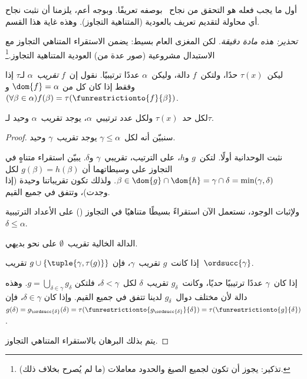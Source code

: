\documentclass[../../../include/open-logic-section]{subfiles}
\begin{document}

أول ما يجب فعله هو التحقق من نجاح~ بوصفه
تعريفًا. وبوجه أعم، يلزمنا أن نثبت نجاح أي محاولة لتقديم تعريف
بالعودية (المتناهية التجاوز). وهذه غاية هذا القسم.

\emph{تحذير: هذه مادة دقيقة}. لكن المغزى العام بسيط: يضمن الاستقراء
المتناهي التجاوز مع الاستبدال مشروعية (صور عدة من) العودية المتناهية
التجاوز.\footnote{تذكير: يجوز أن تكون لجميع الصيغ والحدود معاملات
  (ما لم يُصرح بخلاف ذلك).}

\begin{defn}
	ليكن~$\tau(x)$ حدًا، ولتكن~$f$ دالة، وليكن~$\alpha$ عددًا ترتيبيًا.
	نقول إن~$f$ \emph{تقريب~$\alpha$} لـ$\tau$ إذا وفقط إذا كان كل من
	$\dom{f} = \alpha$ و
	$(\forall \beta \in \alpha)f(\beta) =
	\tau(\funrestrictionto{f}{\beta})$.
\end{defn}

\begin{lem}
لكل حد~$\tau(x)$ ولكل عدد ترتيبي~$\alpha$، يوجد تقريب~$\alpha$ وحيد
لـ$\tau$.
\end{lem}
\begin{proof}
سنبيّن أنه لكل~$\gamma \leq \alpha$ يوجد تقريب~$\gamma$ وحيد.

نثبت الوحدانية أولًا. لتكن~$g$ و$h$، على الترتيب، تقريبي~$\gamma$
و$\delta$. يبيّن استقراء متناهٍ في التجاوز على وسيطاتهما أن
$g(\beta) = h(\beta)$ لكل
$\beta \in \dom{g} \cap \dom{h} =
\gamma \cap \delta = \min(\gamma, \delta)$. ولذلك تكون تقريباتنا وحيدة
(إذا وجدت)، وتتفق في جميع القيم.

ولإثبات الوجود، نستعمل الآن استقراءً بسيطًا متناهيًا في التجاوز
() على الأعداد الترتيبية
$\delta \leq \alpha$.

الدالة الخالية تقريب~$\emptyset$ على نحو بديهي.

إذا كانت~$g$ تقريب~$\gamma$، فإن
$g \cup \{\tuple{\gamma, \tau(g)}\}$ تقريب~$\ordsucc{\gamma}$.

إذا كان~$\gamma$ عددًا ترتيبيًا حديًا، وكانت~$g_\delta$ تقريب~$\delta$
لكل~$\delta < \gamma$، فلتكن
$g = \bigcup_{\delta \in \gamma} g_\delta$. وهذه دالة لأن مختلف
دوال~$g_\delta$ لدينا تتفق في جميع القيم. وإذا كان
$\delta \in \gamma$، فإن
$g(\delta) = g_{\ordsucc{\delta}}(\delta) =
\tau(\funrestrictionto{g_{\ordsucc{\delta}}}{\delta}) =
\tau(\funrestrictionto{g}{\delta})$.

يتم بذلك البرهان بالاستقراء المتناهي التجاوز.
\end{proof}
\end{document}
